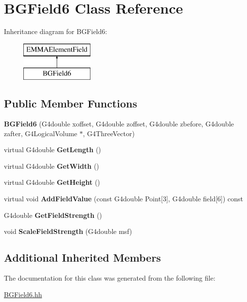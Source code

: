 \hypertarget{classBGField6}{\section{B\-G\-Field6 Class Reference}
\label{classBGField6}
}
Inheritance diagram for B\-G\-Field6\-:\begin{figure}[H]
\begin{center}
\leavevmode
\includegraphics[height=2.000000cm]{classBGField6}
\end{center}
\end{figure}
\subsection*{Public Member Functions}
\begin{DoxyCompactItemize}
\item 
\hypertarget{classBGField6_a6f02a8a1e9643d6177d5f3f30d7a46e0}{{\bfseries B\-G\-Field6} (G4double xoffset, G4double zoffset, G4double zbefore, G4double zafter, G4\-Logical\-Volume $\ast$, G4\-Three\-Vector)}\label{classBGField6_a6f02a8a1e9643d6177d5f3f30d7a46e0}

\item 
\hypertarget{classBGField6_ae0703e3eeb230040b028aaae44b2f2a4}{virtual G4double {\bfseries Get\-Length} ()}\label{classBGField6_ae0703e3eeb230040b028aaae44b2f2a4}

\item 
\hypertarget{classBGField6_a620f1dfb4e72bf4cd8156eff68f4359a}{virtual G4double {\bfseries Get\-Width} ()}\label{classBGField6_a620f1dfb4e72bf4cd8156eff68f4359a}

\item 
\hypertarget{classBGField6_a47b7a214491b4317706fcd61d0f9feef}{virtual G4double {\bfseries Get\-Height} ()}\label{classBGField6_a47b7a214491b4317706fcd61d0f9feef}

\item 
\hypertarget{classBGField6_aaacc495750db2c0672cc4c7be39a6c8c}{virtual void {\bfseries Add\-Field\-Value} (const G4double Point\mbox{[}3\mbox{]}, G4double field\mbox{[}6\mbox{]}) const }\label{classBGField6_aaacc495750db2c0672cc4c7be39a6c8c}

\item 
\hypertarget{classBGField6_a4af95bf2bc47babe4c29f814bb8afa1c}{G4double {\bfseries Get\-Field\-Strength} ()}\label{classBGField6_a4af95bf2bc47babe4c29f814bb8afa1c}

\item 
\hypertarget{classBGField6_a8045ecf2de2401570f87f72270875b72}{void {\bfseries Scale\-Field\-Strength} (G4double msf)}\label{classBGField6_a8045ecf2de2401570f87f72270875b72}

\end{DoxyCompactItemize}
\subsection*{Additional Inherited Members}


The documentation for this class was generated from the following file\-:\begin{DoxyCompactItemize}
\item 
\hyperlink{BGField6_8hh}{B\-G\-Field6.\-hh}\end{DoxyCompactItemize}
